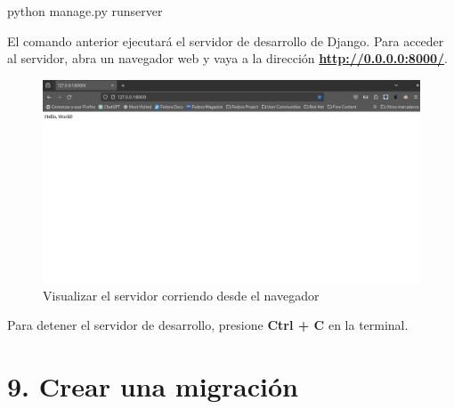 \documentclass[
  a4paper,
  DIV=11,
  numbers=noendperiod,
  onepage,
  openany]{scrreprt}
\newenvironment{Shaded}{\begin{snugshade}}{\end{snugshade}}
\newcommand{\ExtensionTok}[1]{\textcolor[rgb]{0.00,0.23,0.31}{#1}}
\newcommand{\NormalTok}[1]{\textcolor[rgb]{0.00,0.23,0.31}{#1}}
\begin{document}
\begin{Shaded}
\begin{Highlighting}[]
\ExtensionTok{python}\NormalTok{ manage.py runserver}
\end{Highlighting}
\end{Shaded}

El comando anterior ejecutará el servidor de desarrollo de Django. Para
acceder al servidor, abra un navegador web y vaya a la dirección
\textbf{\url{http://0.0.0.0:8000/}}.

\begin{figure}[H]

{\centering \includegraphics{images/navegador_django.png}

}

\caption{Visualizar el servidor corriendo desde el navegador}

\end{figure}%

\begin{tcolorbox}[enhanced jigsaw, title=\textcolor{quarto-callout-tip-color}{\faLightbulb}\hspace{0.5em}{Tip}, colback=white, rightrule=.15mm, opacityback=0, colframe=quarto-callout-tip-color-frame, titlerule=0mm, opacitybacktitle=0.6, breakable, coltitle=black, colbacktitle=quarto-callout-tip-color!10!white, bottomtitle=1mm, toptitle=1mm, left=2mm, arc=.35mm, toprule=.15mm, leftrule=.75mm, bottomrule=.15mm]

Para detener el servidor de desarrollo, presione \textbf{Ctrl + C} en la
terminal.

\end{tcolorbox}

\section{9. Crear una migración}\label{crear-una-migraciuxf3n}
\end{document}
